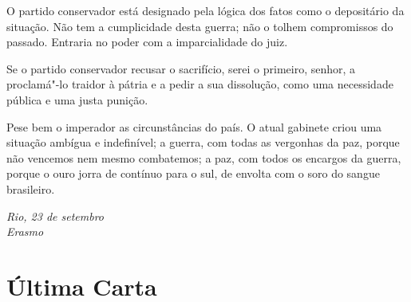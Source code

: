 \begin{linenumbers}
O partido conservador está designado pela lógica dos fatos como o
depositário da situação. Não tem a cumplicidade desta guerra; não o
tolhem compromissos do passado. Entraria no poder com a imparcialidade do juiz.

Se o partido conservador recusar o sacrifício, serei o primeiro,
senhor, a proclamá"-lo traidor à pátria e a pedir a sua dissolução,
como uma necessidade pública e uma justa punição.

Pese bem o imperador as circunstâncias do país. O atual gabinete criou
uma situação ambígua e indefinível; a guerra, com todas as vergonhas da
paz, porque não vencemos nem mesmo combatemos; a paz, com todos os
encargos da guerra, porque o ouro jorra de contínuo para o sul, de
envolta com o soro do sangue brasileiro. 

\end{linenumbers}

\begin{flushright}
\textit{Rio, 23 de setembro\\
Erasmo}
\end{flushright}

\chapter{Última Carta}

